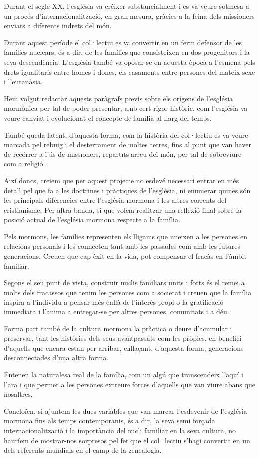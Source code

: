     Durant el segle XX, l'església va créixer substancialment i es va veure sotmesa a un procés d'internacionalització, en gran mesura, gràcies a la feina dels missioners enviats a diferents indrets del món.

    Durant aquest període el col·lectiu es va convertir en un ferm defensor de les famílies nuclears, és a dir, de les famílies que consisteixen en dos progenitors i la seva descendència. L'església també va oposar-se en aquesta època a l'esmena pels drets igualitaris entre homes i dones, els casaments entre persones del mateix sexe i l'eutanàsia.

    Hem volgut redactar aquests paràgrafs previs sobre els orígens de l'església mormònica per tal de poder presentar, amb cert rigor històric, com l'església va veure canviat i evolucionat el concepte de família al llarg del temps.

    També queda latent, d'aquesta forma, com la història del col·lectiu es va veure marcada pel rebuig i el desterrament de moltes terres, fins al punt que van haver de recórrer a l'ús de missioners, repartits arreu del món, per tal de sobreviure com a religió.

    Així doncs, creiem que per aquest projecte no esdevé necessari entrar en més detall pel que fa a les doctrines i pràctiques de l'església, ni  enumerar quines són les principals diferencies entre l'església mormona i les altres corrents del cristianisme. Per altra banda, sí que volem realitzar una reflexió final sobre la posició actual de l'església mormona respecte a la família.

    Pels mormons, les famílies representen els lligams que uneixen a les persones en relacions personals i les connecten tant amb les passades com amb les futures generacions. Creuen que cap èxit en la vida, pot compensar el fracàs en l'àmbit familiar.

    Segons el seu punt de vista, construir nuclis familiars units i forts és el remei a molts dels fracassos que tenim les persones com a societat i creuen que la família inspira a l'individu a pensar més enllà de l'interès propi o la gratificació immediata i l'anima a entregar-se per altres persones, comunitats i a déu.

    Forma part també de la cultura mormona la pràctica o deure d'acumular i preservar, tant les històries dels seus avantpassats com les pròpies, en benefici d'aquells que encara estan per arribar, enllaçant, d'aquesta forma, generacions desconnectades d'una altra forma.

    Entenen la naturalesa real de la família, com un algú que transcendeix l'aquí i l'ara i que permet a les persones extreure forces d'aquells que van viure abans que nosaltres.

    Concloïen, si ajuntem les dues variables que van marcar l'esdevenir de l'església mormona fins als temps contemporanis, és a dir, la seva semi forçada internacionalització i la importància del nucli familiar en la seva cultura, no hauríem de mostrar-nos sorpresos pel fet que el col·lectiu s'hagi convertit en un dels referents mundials en el camp de la genealogia.
